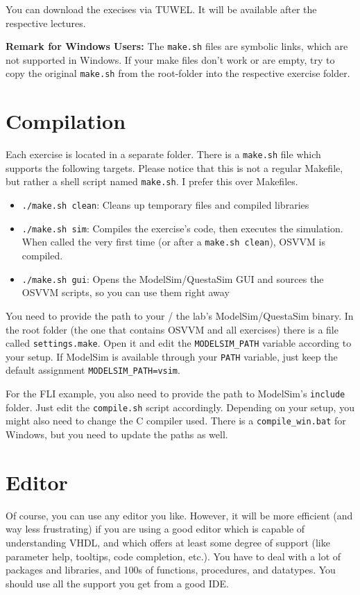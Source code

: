 \documentclass[12pt,epsf,makeidx,oneside]{book}
\begin{document}
  You can download the execises via TUWEL. It will be available after the respective lectures.

  \vspace*{0.7cm}

  {\bf Remark for Windows Users: } The {\tt make.sh} files are symbolic links, which are not supported in Windows. If your make files don't work or are empty,
  try to copy the original {\tt make.sh} from the root-folder into the respective exercise folder.

\section{Compilation}
  Each exercise is located in a separate folder. There is a {\tt make.sh} file which supports the following targets. Please notice that this
  is not a regular Makefile, but rather a shell script named {\tt make.sh}. I prefer this over Makefiles.
  \begin{itemize}[noitemsep]
    \item {\tt ./make.sh clean}: Cleans up temporary files and compiled libraries
    \item {\tt ./make.sh sim}: Compiles the exercise's code, then executes the simulation. When called the very first time (or after a {\tt make.sh clean}), OSVVM is compiled.
    \item {\tt ./make.sh gui}: Opens the ModelSim/QuestaSim GUI and sources the OSVVM scripts, so you can use them right away
  \end{itemize}
  You need to provide the path to your / the lab's ModelSim/QuestaSim binary. In the root folder (the one that contains OSVVM and all 
  exercises) there is a file called {\tt settings.make}. Open it and edit the {\tt MODELSIM\_PATH} variable according to your setup.
  If ModelSim is available through your {\tt PATH} variable, just keep the default assignment {\tt MODELSIM\_PATH=vsim}.

  For the FLI example, you also need to provide the path to ModelSim's {\tt include} folder. Just edit the {\tt compile.sh} script accordingly. Depending on your setup,
  you might also need to change the C compiler used. There is a {\tt compile\_win.bat} for Windows, but you need to update the paths as well.

\section{Editor}
  Of course, you can use any editor you like. However, it will be more efficient (and way less frustrating) if you are using a good editor which is capable of
  understanding VHDL, and which offers at least some degree of support (like parameter help, tooltips, code completion, etc.). You have to deal with a lot
  of packages and libraries, and 100s of functions, procedures, and datatypes. You should use all the support you get from a good IDE.
\end{document}
